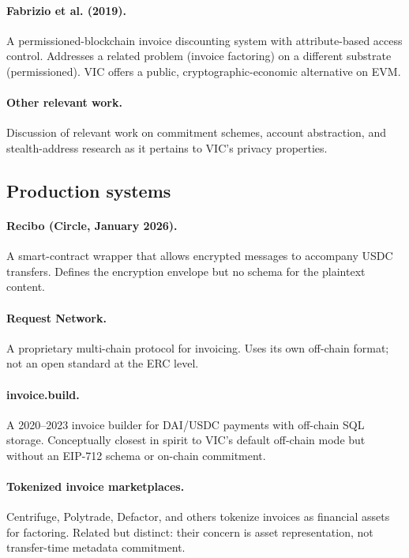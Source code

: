 \documentclass[11pt,a4paper]{article}
\begin{document}
\paragraph{Fabrizio et al. (2019).} A permissioned-blockchain invoice discounting system with attribute-based access control. Addresses a related problem (invoice factoring) on a different substrate (permissioned). VIC offers a public, cryptographic-economic alternative on EVM.

\paragraph{Other relevant work.} Discussion of relevant work on commitment schemes, account abstraction, and stealth-address research as it pertains to VIC's privacy properties.

\subsection{Production systems}

\paragraph{Recibo (Circle, January 2026).} A smart-contract wrapper that allows encrypted messages to accompany USDC transfers. Defines the encryption envelope but no schema for the plaintext content.

\paragraph{Request Network.} A proprietary multi-chain protocol for invoicing. Uses its own off-chain format; not an open standard at the ERC level.

\paragraph{invoice.build.} A 2020--2023 invoice builder for DAI/USDC payments with off-chain SQL storage. Conceptually closest in spirit to VIC's default off-chain mode but without an EIP-712 schema or on-chain commitment.

\paragraph{Tokenized invoice marketplaces.} Centrifuge, Polytrade, Defactor, and others tokenize invoices as financial assets for factoring. Related but distinct: their concern is asset representation, not transfer-time metadata commitment.
\end{document}
